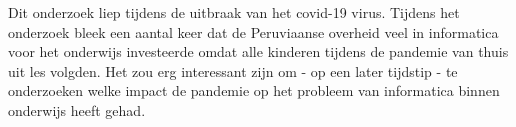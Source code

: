 Dit onderzoek liep tijdens de uitbraak van het covid-19 virus. Tijdens het onderzoek bleek een aantal keer dat de Peruviaanse overheid veel in informatica voor het onderwijs investeerde omdat alle kinderen tijdens de pandemie van thuis uit les volgden. Het zou erg interessant zijn om - op een later tijdstip - te onderzoeken welke impact de pandemie op het probleem van informatica binnen onderwijs heeft gehad.


